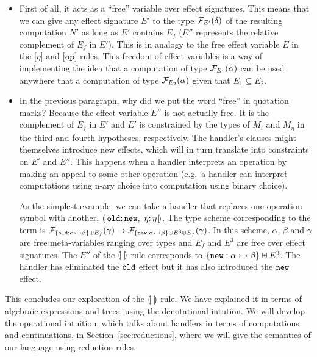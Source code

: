 \begin{itemize}
\item First of all, it acts as a ``free'' variable over effect
  signatures. This means that we can give any effect signature $E'$ to the
  type $\mathcal{F}_{E'}(\delta)$ of the resulting computation $N'$ as long as $E'$
  contains $E_f$ ($E''$ represents the relative complement of $E_f$ in
  $E'$). This is in analogy to the free effect variable $E$ in the [$\eta$]
  and [$\mathtt{op}$] rules. This freedom of effect variables is a way of
  implementing the idea that a computation of type $\mathcal{F}_{E_1}(\alpha)$ can
  be used anywhere that a computation of type $\mathcal{F}_{E_2}(\alpha)$ given
  that $E_1 \subseteq E_2$.

\item In the previous paragraph, why did we put the word ``free'' in
  quotation marks?  Because the effect variable $E''$ is not actually
  free. It is the complement of $E_f$ in $E'$ and $E'$ is constrained by
  the types of $M_i$ and $M_\eta$ in the third and fourth hypotheses,
  respectively. The handler's clauses might themselves introduce new
  effects, which will in turn translate into constraints on $E'$ and
  $E''$. This happens when a handler interprets an operation by making an
  appeal to some other operation (e.g.\ a handler can interpret
  computations using n-ary choice into computation using binary choice).

  As the simplest example, we can take a handler that replaces one
  operation symbol with another,
  $\banana{\onto{\op{old}} \op{new},\ \onto{\eta} \eta}$. The type scheme
  corresponding to the term is $\mathcal{F}_{\{\mathtt{old} : \alpha \rightarrowtail \beta\}
    \uplus E_f}(\gamma) \to \mathcal{F}_{\{\mathtt{new} : \alpha \rightarrowtail \beta\} \uplus
    E^3 \uplus E_f}(\gamma)$. In this scheme, $\alpha$, $\beta$ and
  $\gamma$ are free meta-variables ranging over types and $E_f$ and $E^3$
  are free over effect signatures. The $E''$ of the $\llparenthesis \,  \, \rrparenthesis$ rule
  corresponds to $\{\mathtt{new} : \alpha \rightarrowtail \beta\} \uplus E^3$. The handler
  has eliminated the $\mathtt{old}$ effect but it has also introduced the
  $\mathtt{new}$ effect.
\end{itemize}

This concludes our exploration of the $\llparenthesis \,  \, \rrparenthesis$ rule. We have explained
it in terms of algebraic expressions and trees, using the denotational
intution. We will develop the operational intuition, which talks about
handlers in terms of computations and continuations, in
Section~\ref{sec:reductions}, where we will give the semantics of our
language using reduction rules.

